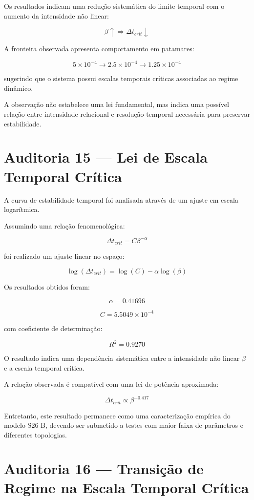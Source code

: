 \documentclass[11pt,a4paper]{article}
\begin{document}
Os resultados indicam uma redução sistemática do limite temporal
com o aumento da intensidade não linear:

\[
\beta \uparrow
\Rightarrow
\Delta t_{crit}\downarrow
\]

A fronteira observada apresenta comportamento em patamares:

\[
5\times10^{-4}
\rightarrow
2.5\times10^{-4}
\rightarrow
1.25\times10^{-4}
\]

sugerindo que o sistema possui escalas temporais críticas
associadas ao regime dinâmico.

A observação não estabelece uma lei fundamental, mas indica
uma possível relação entre intensidade relacional e resolução
temporal necessária para preservar estabilidade.
\section{Auditoria 15 — Lei de Escala Temporal Crítica}

A curva de estabilidade temporal foi analisada através de um
ajuste em escala logarítmica.

Assumindo uma relação fenomenológica:

\[
\Delta t_{crit}=C\beta^{-\alpha}
\]

foi realizado um ajuste linear no espaço:

\[
\log(\Delta t_{crit})
=
\log(C)-\alpha\log(\beta)
\]

Os resultados obtidos foram:

\[
\alpha=0.41696
\]

\[
C=5.5049\times10^{-4}
\]

com coeficiente de determinação:

\[
R^2=0.9270
\]

O resultado indica uma dependência sistemática entre a
intensidade não linear $\beta$ e a escala temporal crítica.

A relação observada é compatível com uma lei de potência
aproximada:

\[
\Delta t_{crit}
\propto
\beta^{-0.417}
\]

Entretanto, este resultado permanece como uma caracterização
empírica do modelo S26-B, devendo ser submetido a testes com
maior faixa de parâmetros e diferentes topologias.
\section{Auditoria 16 — Transição de Regime na Escala Temporal Crítica}
\end{document}
